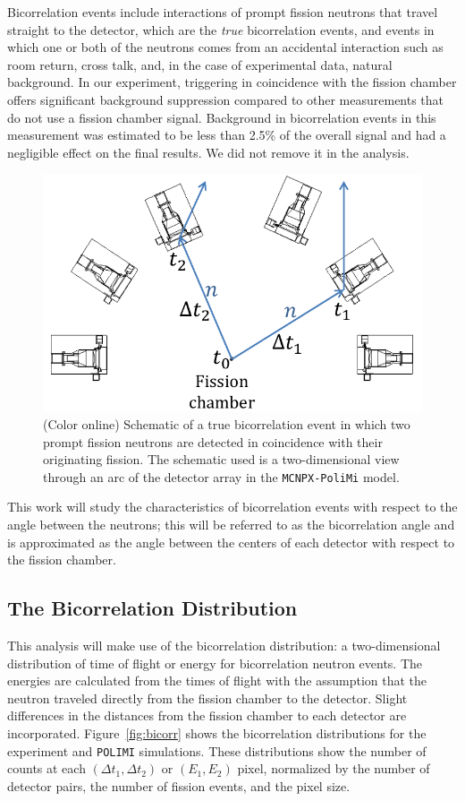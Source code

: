 \documentclass[preprint,12pt]{elsarticle}
\newcommand{\figfirst}[1]  {Figure~\ref{#1}}
\newcommand{\mcnpxpolimi}     {\texttt{MCNPX-PoliMi}\xspace}
\newcommand{\polimi}          {\texttt{POLIMI}\xspace}
\newcommand{\coloronline}     {(Color online)\xspace}
\newcommand{\Dto}{\ensuremath{\Delta t_1}\xspace}
\newcommand{\Dtt}{\ensuremath{\Delta t_2}\xspace}
\newcommand{\Eo}{\ensuremath{E_1}\xspace}
\newcommand{\Et}{\ensuremath{E_2}\xspace}
\begin{document}
Bicorrelation events include interactions of prompt fission neutrons that travel straight to the detector, which are the \textit{true} bicorrelation events, and events in which one or both of the neutrons comes from an accidental interaction such as room return, cross talk, and, in the case of experimental data, natural background. In our experiment, triggering in coincidence with the fission chamber offers significant background suppression compared to other measurements that do not use a fission chamber signal. Background in bicorrelation events in this measurement was estimated to be less than 2.5\% of the overall signal and had a negligible effect on the final results. We did not remove it in the analysis. 

\begin{figure}[h]
	\centering\includegraphics[width=0.5\linewidth]{bicorrelation_sketch.pdf}
	\caption{\coloronline Schematic of a true bicorrelation event in which two prompt fission neutrons are detected in coincidence with their originating fission. The schematic used is a two-dimensional view through an arc of the detector array in the \mcnpxpolimi model. }
	\label{fig:sketch}
\end{figure}

This work will study the characteristics of bicorrelation events with respect to the angle between the neutrons; this will be referred to as the bicorrelation angle and is approximated as the angle between the centers of each detector with respect to the fission chamber.

\subsection{The Bicorrelation Distribution}\label{sec:bicorrelation_distribution}

This analysis will make use of the bicorrelation distribution: a two-dimensional distribution of time of flight or energy for bicorrelation neutron events. The energies are calculated from the times of flight with the assumption that the neutron traveled directly from the fission chamber to the detector. Slight differences in the distances from the fission chamber to each detector are incorporated. \figfirst{fig:bicorr} shows the bicorrelation distributions for the experiment and \polimi simulations. These distributions show the number of counts at each $(\Dto,\Dtt)$ or $(\Eo,\Et)$ pixel, normalized by the number of detector pairs, the number of fission events, and the pixel size. 
\end{document}
